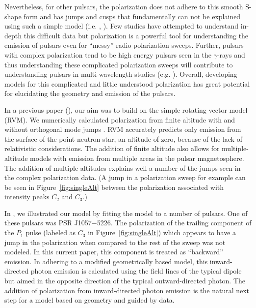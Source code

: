 Nevertheless, for other pulsars, the polarization does not
adhere to this smooth S-shape form and has jumps and cusps that
fundamentally can not be explained using such a simple model
(i.e. \citealp{yan2011polarization}, \citealp{everett2001emission}).
Few studies have attempted to understand in-depth this difficult data but
polarization is a powerful tool for understanding
the emission of pulsars even for ``messy'' radio polarization sweeps.
Further, pulsars with complex polarization tend to be high energy
pulsars seen in the $\gamma$-rays and thus understanding these
complicated polarization sweeps will contribute to understanding 
pulsars in multi-wavelength studies (e.g. \citealp{keith2012high}).
Overall, 
developing models for this complicated
and little understood polarization
has great potential for elucidating the geometry and
emission of the pulsars.

In a previous paper (\citealp{craig2014tackling}), our aim was to build on the
simple rotating vector model (RVM).  We numerically calculated
polarization from finite altitude with and without
orthogonal mode jumps \citep{backer1976orthogonal}.
RVM accurately predicts only emission from 
the surface of the point neutron star, an altitude of zero,
because of the lack of relativistic considerations. 
The addition of finite altitude also allows for multiple-altitude
models with emission from multiple areas in the pulsar magnetosphere.
The addition of multiple altitudes explains well a number
of the jumps seen in the complex polarization data.  (A jump
in a polarization sweep for example can be seen in Figure~\ref{fig:singleAlt} 
between the polarization associated with intensity peaks $C_2$ and $C_3$.)

In \cite{craig2014tackling}, we illustrated our model by fitting 
the model to a number of pulsars.  One of these pulsars was PSR J1057$-$5226.
The polarization of the trailing component of the
$P_1$ pulse (labeled as $C_3$ in Figure~\ref{fig:singleAlt}) 
which appears to have a jump in the polarization when compared
to the rest of the sweep was not modeled.  In this current paper, this component
is treated as ``backward'' emission.
In adhering to a modified geometrically based model, this
inward-directed photon emission is calculated using the field lines of the
typical dipole but aimed in the opposite direction
of the typical outward-directed photon.  The addition of 
polarization from inward-directed photon emission is the natural next step for
a model based on geometry and guided by data.

